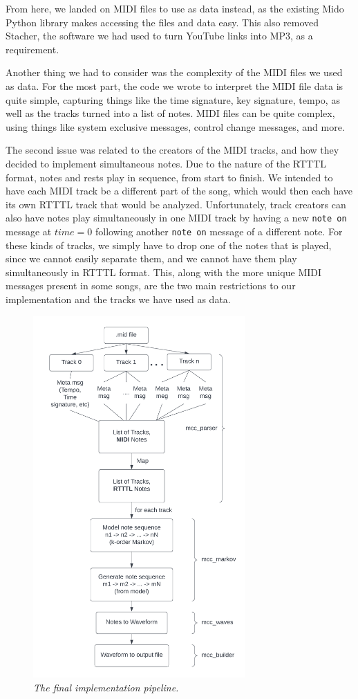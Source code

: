 \documentclass{article}
\begin{document}
From here, we landed on MIDI files to use as data instead, as the existing Mido Python library makes accessing the files and data easy. This also removed Stacher, the 
software we had used to turn YouTube links into MP3, as a requirement.

Another thing we had to consider was the complexity of the MIDI files we used as data. For the most part, the code we wrote to interpret the MIDI file data is quite simple, 
capturing things like the time signature, key signature, tempo, as well as the tracks turned into a list of notes. MIDI files can be quite complex, using things like 
system exclusive messages, control change messages, and more. 

The second issue was related to the creators of the MIDI tracks, and how they decided to implement simultaneous notes. Due to the nature of the RTTTL format, notes and rests 
play in sequence, from start to finish. We intended to have each MIDI track be a different part of the song, which would then each have its own RTTTL track that would be 
analyzed. Unfortunately, track creators can also have notes play simultaneously in one MIDI track by having a new \texttt{note on} message at $time = 0$ following another 
\texttt{note on} message of a different note. For these kinds of tracks, we simply have to drop one of the notes that is played, since we cannot easily separate them, and we 
cannot have them play simultaneously in RTTTL format. This, along with the more unique MIDI messages present in some songs, are the two main restrictions to our implementation 
and the tracks we have used as data. \\


\begin{figure} 
\includegraphics[width=230pt]{figs/roadmap.png} 
\caption{\small \sl The final implementation pipeline.\label{fig:roadmap}} 
\end{figure} 
\end{document}
